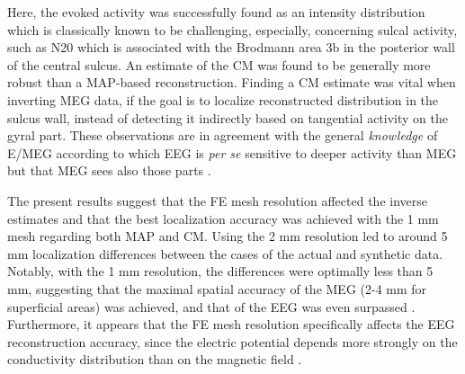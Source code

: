 \documentclass[5p]{elsarticle}
\begin{document}
Here, the evoked activity was successfully found as an intensity distribution which is classically known to be challenging, especially, concerning sulcal activity, such as N20 which is associated with the Brodmann area 3b in the posterior wall of the central sulcus. %
An estimate of the CM was found to be generally more robust than a MAP-based reconstruction. Finding a CM estimate was vital when inverting MEG data, if the goal is to localize reconstructed distribution in the sulcus wall, instead of detecting it indirectly based on tangential activity on the gyral part. These observations are in agreement with the general {\em knowledge} of E/MEG according to which EEG is {\em per se} sensitive to deeper activity than MEG \citep{hari2018ifcn,hari1990neuromagnetic} but that MEG sees also those parts \citep{attal2009,coffey2016cortical}. 

The present results suggest that the FE mesh resolution affected the inverse estimates and that the best localization accuracy was achieved with the 1 mm mesh regarding both MAP and CM. Using the 2 mm resolution led to around 5 mm localization differences between the cases of the actual and synthetic data. Notably, with the 1 mm resolution, the differences were optimally less than 5 mm, suggesting that the maximal spatial accuracy of the MEG (2-4 mm for superficial areas) \citep{tarkiainen20033d} was achieved, and that of the EEG was even surpassed \cite{cuffin2001realistically,cuffin2001spherical,grover2016fundamental,wang2009relationship}. Furthermore, it appears that the FE mesh resolution  specifically affects the EEG reconstruction accuracy, since the electric potential depends more strongly on the conductivity distribution than on the magnetic field \citep{hamalainen1993}. 
\end{document}
